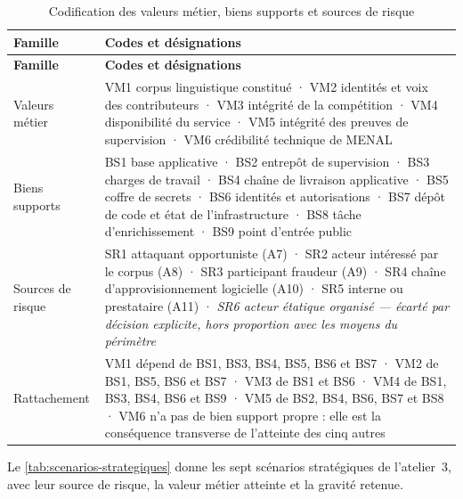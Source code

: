\begin{longtable}{|P{2.5cm}|P{12.8cm}|}
\caption[Codification des ateliers 1 à 3]{Codification des valeurs métier, biens supports et sources de risque}
\label{tab:codification} \\
\hline
\textbf{Famille} & \textbf{Codes et désignations} \\
\hline
\endfirsthead
\hline
\textbf{Famille} & \textbf{Codes et désignations} \\
\hline
\endhead
Valeurs métier & VM1 corpus linguistique constitué · VM2 identités et voix des contributeurs ·
VM3 intégrité de la compétition · VM4 disponibilité du service · VM5 intégrité des preuves de
supervision · VM6 crédibilité technique de MENAL \\ \hline
Biens supports & BS1 base applicative · BS2 entrepôt de supervision · BS3 charges de travail ·
BS4 chaîne de livraison applicative · BS5 coffre de secrets · BS6 identités et autorisations ·
BS7 dépôt de code et état de l'infrastructure · BS8 tâche d'enrichissement · BS9 point d'entrée
public \\ \hline
Sources de risque & SR1 attaquant opportuniste (A7) · SR2 acteur intéressé par le corpus (A8) ·
SR3 participant fraudeur (A9) · SR4 chaîne d'approvisionnement logicielle (A10) · SR5 interne ou
prestataire (A11) · \emph{SR6 acteur étatique organisé --- écarté par décision explicite, hors
proportion avec les moyens du périmètre} \\ \hline
Rattachement & VM1 dépend de BS1, BS3, BS4, BS5, BS6 et BS7 · VM2 de BS1, BS5, BS6 et BS7 ·
VM3 de BS1 et BS6 · VM4 de BS1, BS3, BS4, BS6 et BS9 · VM5 de BS2, BS4, BS6, BS7 et BS8 ·
VM6 n'a pas de bien support propre : elle est la conséquence transverse de l'atteinte des cinq
autres \\
\hline
\end{longtable}

Le \cref{tab:scenarios-strategiques} donne les sept scénarios stratégiques de l'atelier~3,
avec leur source de risque, la valeur métier atteinte et la gravité retenue.

